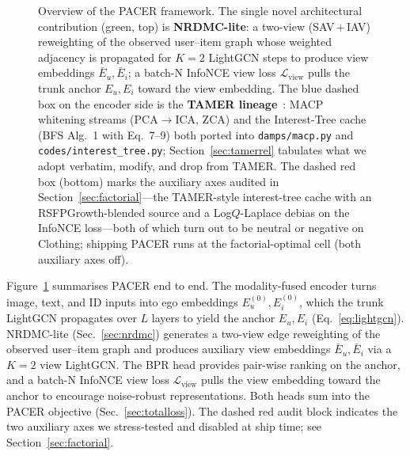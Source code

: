 \documentclass[conference]{IEEEtran}
\newcommand{\Lcal}{\mathcal{L}}
\begin{document}
\begin{figure}[t]
{%
}
\caption{Overview of the PACER framework. The single novel
architectural contribution (green, top) is \textbf{NRDMC-lite}: a
two-view (SAV\,+\,IAV) reweighting of the observed user--item graph
whose weighted adjacency is propagated for $K{=}2$ LightGCN steps to
produce view embeddings $\bar E_u, \bar E_i$; a batch-N InfoNCE view
loss $\Lcal_{\text{view}}$ pulls the trunk anchor $E_u, E_i$ toward
the view embedding. The blue dashed box on the encoder side is the
\textbf{TAMER lineage}~\cite{meng2025tamer}: MACP whitening streams
(PCA$\to$ICA, ZCA) and the Interest-Tree cache (BFS Alg.~1 with
Eq.~7--9) both ported into \texttt{damps/macp.py} and
\texttt{codes/interest\_tree.py}; Section~\ref{sec:tamerrel} tabulates
what we adopt verbatim, modify, and drop from TAMER. The dashed red
box (bottom) marks the auxiliary axes audited in
Section~\ref{sec:factorial}---the TAMER-style interest-tree cache
with an RSFPGrowth-blended source and a Log$Q$-Laplace debias on the
InfoNCE loss---both of which turn out to be neutral or negative on
Clothing; shipping PACER runs at the factorial-optimal cell (both
auxiliary axes off).}
\label{fig:overall}
\end{figure}

Figure~\ref{fig:overall} summarises PACER end to end. The
modality-fused encoder turns image, text, and ID inputs into ego
embeddings $E^{(0)}_u, E^{(0)}_i$, which the trunk LightGCN propagates
over $L$ layers to yield the anchor $E_u, E_i$ (Eq.~\ref{eq:lightgcn}).
NRDMC-lite (Sec.~\ref{sec:nrdmc}) generates a two-view edge
reweighting of the observed user--item graph and produces auxiliary
view embeddings $\bar E_u, \bar E_i$ via a $K{=}2$ view LightGCN. The
BPR head provides pair-wise ranking on the anchor, and a batch-N
InfoNCE view loss $\Lcal_{\text{view}}$ pulls the view embedding
toward the anchor to encourage noise-robust representations. Both
heads sum into the PACER objective (Sec.~\ref{sec:totalloss}). The
dashed red audit block indicates the two auxiliary axes we
stress-tested and disabled at ship time; see Section~\ref{sec:factorial}.
\end{document}
